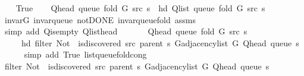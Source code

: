 \begin{isabellebody}
\ \ \isamarkupfalse%
\ True\isanewline
\ \ \isamarkupfalse%
\ {\isachardoublequoteopen}Q{\isacharunderscore}{\kern0pt}head\ {\isacharparenleft}{\kern0pt}queue\ {\isacharparenleft}{\kern0pt}fold\ G\ src\ s{\isacharparenright}{\kern0pt}{\isacharparenright}{\kern0pt}\ {\isacharequal}{\kern0pt}\ hd\ {\isacharparenleft}{\kern0pt}Q{\isacharunderscore}{\kern0pt}list\ {\isacharparenleft}{\kern0pt}queue\ {\isacharparenleft}{\kern0pt}fold\ G\ src\ s{\isacharparenright}{\kern0pt}{\isacharparenright}{\kern0pt}{\isacharparenright}{\kern0pt}{\isachardoublequoteclose}\isanewline
\ \ \ \ \isamarkupfalse%
\ invar{\isacharunderscore}{\kern0pt}G\ invar{\isacharunderscore}{\kern0pt}queue\ not{\isacharunderscore}{\kern0pt}DONE\ invar{\isacharunderscore}{\kern0pt}queue{\isacharunderscore}{\kern0pt}fold{\isacharunderscore}{\kern0pt}{}\ assms\isanewline
\ \ \ \ \isamarkupfalse%
\ {\isacharparenleft}{\kern0pt}simp\ add{\isacharcolon}{\kern0pt}\ Q{\isachardot}{\kern0pt}is{\isacharunderscore}{\kern0pt}empty\ Q{\isachardot}{\kern0pt}list{\isacharunderscore}{\kern0pt}head{\isacharparenright}{\kern0pt}\isanewline
\ \ \isamarkupfalse%
\isanewline
\ \ \ \ {\isachardoublequoteopen}Q{\isacharunderscore}{\kern0pt}head\ {\isacharparenleft}{\kern0pt}queue\ {\isacharparenleft}{\kern0pt}fold\ G\ src\ s{\isacharparenright}{\kern0pt}{\isacharparenright}{\kern0pt}\ {\isacharequal}{\kern0pt}\isanewline
\ \ \ \ \ hd\ {\isacharparenleft}{\kern0pt}filter\ {\isacharparenleft}{\kern0pt}Not\ {\isasymcirc}\ is{\isacharunderscore}{\kern0pt}discovered\ src\ {\isacharparenleft}{\kern0pt}parent\ s{\isacharparenright}{\kern0pt}{\isacharparenright}{\kern0pt}\ {\isacharparenleft}{\kern0pt}G{\isachardot}{\kern0pt}adjacency{\isacharunderscore}{\kern0pt}list\ G\ {\isacharparenleft}{\kern0pt}Q{\isacharunderscore}{\kern0pt}head\ {\isacharparenleft}{\kern0pt}queue\ s{\isacharparenright}{\kern0pt}{\isacharparenright}{\kern0pt}{\isacharparenright}{\kern0pt}{\isacharparenright}{\kern0pt}{\isachardoublequoteclose}\isanewline
\ \ \ \ \isamarkupfalse%
\ {\isacharparenleft}{\kern0pt}simp\ add{\isacharcolon}{\kern0pt}\ True\ list{\isacharunderscore}{\kern0pt}queue{\isacharunderscore}{\kern0pt}fold{\isacharunderscore}{\kern0pt}cong{\isacharparenright}{\kern0pt}\isanewline
\ \ \isamarkupfalse%
\ \isamarkupfalse%
\ {\isachardoublequoteopen}filter\ {\isacharparenleft}{\kern0pt}Not\ {\isasymcirc}\ is{\isacharunderscore}{\kern0pt}discovered\ src\ {\isacharparenleft}{\kern0pt}parent\ s{\isacharparenright}{\kern0pt}{\isacharparenright}{\kern0pt}\ {\isacharparenleft}{\kern0pt}G{\isachardot}{\kern0pt}adjacency{\isacharunderscore}{\kern0pt}list\ G\ {\isacharparenleft}{\kern0pt}Q{\isacharunderscore}{\kern0pt}head\ {\isacharparenleft}{\kern0pt}queue\ s{\isacharparenright}{\kern0pt}{\isacharparenright}{\kern0pt}{\isacharparenright}{\kern0pt}\ {\isasymnoteq}\ {\isacharbrackleft}{\kern0pt}{\isacharbrackright}{\kern0pt}{\isachardoublequoteclose}\isanewline

\end{isabellebody}
